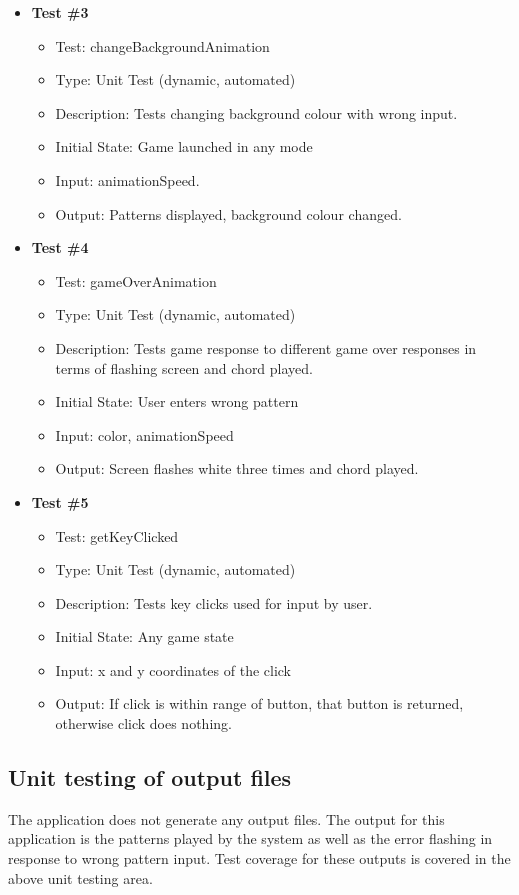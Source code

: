 \documentclass[12pt, titlepage]{article}
\begin{document}
\begin{itemize}
\item \textbf{Test \#3}
\begin{itemize}
\item Test: changeBackgroundAnimation
\item Type: Unit Test (dynamic, automated)			
\item Description: Tests changing background colour with wrong input.	
\item Initial State: Game launched in any mode
\item Input: animationSpeed.
\item Output: Patterns displayed, background colour changed.	
\end{itemize}

\item \textbf{Test \#4}
\begin{itemize}
\item Test: gameOverAnimation
\item Type: Unit Test (dynamic, automated)			
\item Description: Tests game response to different game over responses in terms of flashing screen and chord played.	
\item Initial State: User enters wrong pattern
\item Input: color, animationSpeed
\item Output: Screen flashes white three times and chord played.		
\end{itemize}

\item \textbf{Test \#5}
\begin{itemize}
\item Test: getKeyClicked
\item Type: Unit Test (dynamic, automated)				
\item Description: Tests key clicks used for input by user.	
\item Initial State: Any game state 	
\item Input: x and y coordinates of the click
\item Output: If click is within range of button, that button is returned, otherwise click does nothing.		
\end{itemize}

\end{itemize}

		
\subsection{Unit testing of output files}	
The application does not generate any output files. The output for this application is the patterns played by the system as well as the error flashing in response to wrong pattern input. Test coverage for these outputs is covered in the above unit testing area.
\end{document}
